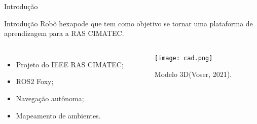 \begin{frame}[c]{Introdução} 
    \transdissolve[duration=0.5]
   
    \begin{center}
    \end{center}
    
\end{frame}

\begin{frame}[t]{Introdução} 
    \transdissolve[duration=0.5]
    Robô hexapode que tem como objetivo se tornar uma plataforma de aprendizagem para a RAS CIMATEC.
        \begin{columns}[t]
                \begin{itemize}
                    \item Projeto do IEEE RAS CIMATEC;
                    \item ROS2 Foxy;
                    \item Navegação autônoma;
                    \item Mapeamento de ambientes.
                \end{itemize}
            \begin{center}
                \begin{figure}
                    \texttt{[image: cad.png]}
                    \caption{Modelo 3D(Voser, 2021).}
                \end{figure}
            \end{center}
        \end{columns}
\end{frame}


